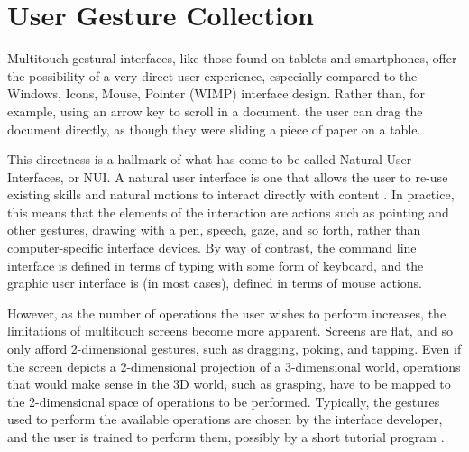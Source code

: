 \chapter{User Gesture Collection}\label{chapter:user_experiment}
\thispagestyle{fancy}

Multitouch gestural interfaces, like those found on tablets and smartphones, offer the possibility of a very direct user experience, especially compared to the Windows, Icons, Mouse, Pointer (WIMP) interface design. 
Rather than, for example, using an arrow key to scroll in a document, the user can drag the document directly, as though they were sliding a  piece of paper on a table. 

This directness is a hallmark of what has come to be called Natural User Interfaces, or NUI. 
A natural user interface is one that allows the user to re-use existing skills and natural motions to interact directly with content \citep{blakeNUIWin}. 
In practice, this means that the elements of the interaction are actions such as pointing and other gestures, drawing with a pen, speech, gaze, and so forth, rather than computer-specific interface devices. 
By way of contrast, the command line interface is defined in terms of typing with some form of keyboard, and the graphic user interface is (in most cases), defined in terms of mouse actions. 

However, as the number of operations the user wishes to perform increases, the limitations of multitouch screens become more apparent. 
Screens are flat, and so only afford 2-dimensional gestures, such as dragging, poking, and tapping. 
Even if the screen depicts a 2-dimensional projection of a 3-dimensional world, operations that would make sense in the 3D world, such as grasping, have to be mapped to the 2-dimensional space of operations to be performed. 
Typically, the gestures used to perform the available operations are chosen by the interface developer, and the user is trained to perform them, possibly by a short tutorial program \citep{wobbrock2009user, vanacken2008ghosts, freeman2009shadowguides}. 

